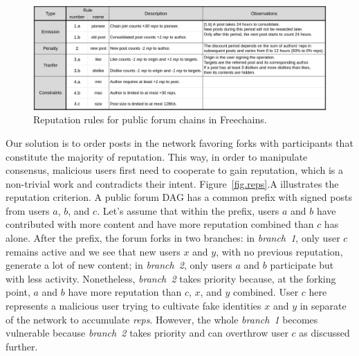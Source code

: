 \documentclass[10pt,journal,compsoc]{IEEEtran}
\newcommand{\FC}       {Freechains\xspace}
\newcommand{\reps}     {\emph{reps}\xspace}
\begin{document}
\begin{figure}[ht]
\centering
\includegraphics[width=\textwidth]{rules.png}
\caption{Reputation rules for public forum chains in \FC.}
\label{fig.rules}
\end{figure}

Our solution is to order posts in the network favoring forks with participants
that constitute the majority of reputation.
This way, in order to manipulate consensus, malicious users first need to
cooperate to gain reputation, which is a non-trivial work and contradicts their
intent.
%
Figure~\ref{fig.reps}.A illustrates the reputation criterion.
A public forum DAG has a common prefix with signed posts from users $a$, $b$,
and $c$.
Let's assume that within the prefix, users $a$ and $b$ have contributed with
more content and have more reputation combined than $c$ has alone.
%
After the prefix, the forum forks in two branches:
in \emph{branch~1}, only user $c$ remains active and we see that new users $x$
and $y$, with no previous reputation, generate a lot of new content;
in \emph{branch~2}, only users $a$ and $b$ participate but with less activity.
Nonetheless, \emph{branch~2} takes priority because, at the forking point, $a$
and $b$ have more reputation than $c$, $x$, and $y$ combined.
%
User $c$ here represents a malicious user trying to cultivate fake identities
$x$ and $y$ in separate of the network to accumulate \reps.
However, the whole \emph{branch~1} becomes vulnerable because \emph{branch~2}
takes priority and can overthrow user $c$ as discussed further.
\end{document}

